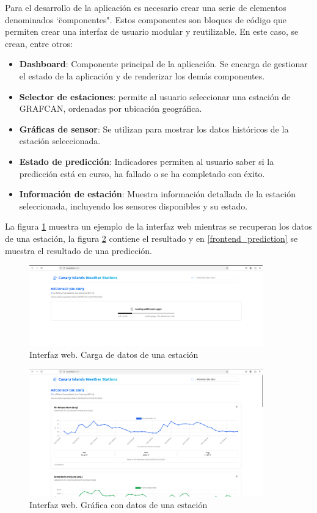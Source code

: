 Para el desarrollo de la aplicación es necesario crear una serie de elementos denominados \char`\"componentes". Estos componentes son bloques de código que 
permiten crear una interfaz de usuario modular y reutilizable. En este caso, se crean, entre otros:
\begin{itemize}
    \item \textbf{Dashboard}: Componente principal de la aplicación. Se encarga de gestionar el estado de la aplicación y de renderizar los demás componentes.
    \item \textbf{Selector de estaciones}: permite al usuario seleccionar una estación de GRAFCAN, ordenadas por ubicación geográfica.
    \item \textbf{Gráficas de sensor}: Se utilizan para mostrar los datos históricos de la estación seleccionada. 
    \item \textbf{Estado de predicción}: Indicadores permiten al usuario saber si la predicción está en curso, ha fallado o se ha completado con éxito.
    \item \textbf{Información de estación}: Muestra información detallada de la estación seleccionada, incluyendo los sensores disponibles y su estado.
\end{itemize}

La figura \ref{frontend_loading} muestra un ejemplo de la interfaz web mientras se recuperan los datos de una estación, la figura 
\ref{frontend_loaded} contiene el resultado y en \ref{frontend_prediction} se muestra el resultado de una predicción.

\begin{figure}[H]
    \centering
    \includegraphics[width=0.9\textwidth]{images/frontend_loading.png}
    \caption{Interfaz web. Carga de datos de una estación}
    \label{frontend_loading}
\end{figure}

\begin{figure}[H]
    \centering
    \includegraphics[width=0.9\textwidth]{images/frontend_loaded.png}
    \caption{Interfaz web. Gráfica con datos de una estación}
    \label{frontend_loaded}
\end{figure}

